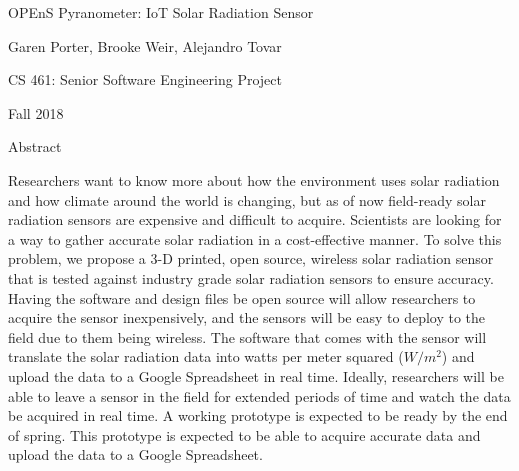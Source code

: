 \documentclass[10pt,draftclsnofoot,onecolumn,letterpaper]{article}
\begin{document}
\begin{Center}
{\fontsize{14pt}{16.8pt}\selectfont OPEnS Pyranometer: IoT Solar Radiation Sensor\par}
\end{Center}\par
    
\begin{Center}
Garen Porter, Brooke Weir, Alejandro Tovar
\end{Center}\par
    
\begin{Center}
CS 461: Senior Software Engineering Project
\end{Center}\par
    
\begin{Center}
Fall 2018
\end{Center}\par
    
\begin{Center}
{\fontsize{14pt}{16.8pt}\selectfont Abstract\par}
\end{Center}\par
    
{\fontsize{10pt}{12.0pt}\selectfont Researchers want to know more about how the environment uses solar radiation and how climate around the world is changing, but as of now field-ready solar radiation sensors are expensive and difficult to acquire. Scientists are looking for a way to gather accurate solar radiation in a cost-effective manner. To solve this problem, we propose a 3-D printed, open source, wireless solar radiation sensor that is tested against industry grade solar radiation sensors to ensure accuracy. Having the software and design files be open source will allow researchers to acquire the sensor inexpensively, and the sensors will be easy to deploy to the field due to them being wireless. The software that comes with the sensor will translate the solar radiation data into watts per meter squared ($W/m^2$) and upload the data to a Google Spreadsheet in real time. Ideally, researchers will be able to leave a sensor in the field for extended periods of time and watch the data be acquired in real time. A working prototype is expected to be ready by the end of spring. This prototype is expected to be able to acquire accurate data and upload the data to a Google Spreadsheet.\par}\par
    
\end{document}
